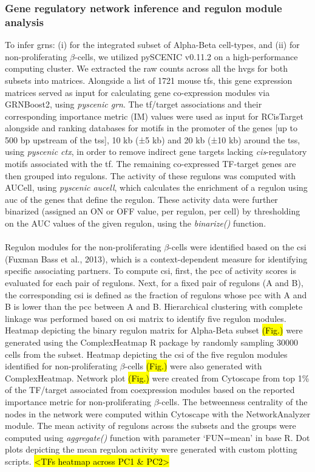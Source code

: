 \subsubsection{\large Gene regulatory network inference and regulon module analysis}
To infer \glspl{grn}: (i) for the integrated subset of Alpha-Beta cell-types, and (ii) for non-proliferating $\beta$-cells, we utilized pySCENIC v0.11.2 on a high-performance computing cluster. We extracted the raw counts across all the \glspl{hvg} for both subsets into matrices. Alongside a list of 1721 mouse \glspl{tf}, this gene expression matrices served as input for calculating gene co-expression modules via GRNBoost2, using \textit{pyscenic grn}. The \gls{tf}/target associations and their corresponding importance metric (IM) values were used as input for RCisTarget alongside and ranking databases for motifs in the promoter of the genes [up to 500 \gls{bp} upstream of the \gls{tss}], 10 kb (±5 kb) and 20 kb (±10 kb) around the \gls{tss}, using \textit{pyscenic ctx}, in order to remove indirect gene targets lacking \textit{cis}-regulatory motifs associated with the \gls{tf}. The remaining co-expressed TF-target genes are then grouped into regulons. The activity of these regulons was computed with AUCell, using \textit{pyscenic aucell}, which calculates the enrichment of a regulon using \gls{auc} of the genes that define the regulon. These activity data were further binarized (assigned an ON or OFF value, per regulon, per cell) by thresholding on the AUC values of the given regulon, using the \textit{binarize()} function.\\\\
Regulon modules for the non-proliferating $\beta$-cells were identified based on the \gls{csi} (Fuxman Bass et al., 2013), which is a context-dependent measure for identifying specific associating partners. To compute \gls{csi}, first, the \gls{pcc} of activity scores is evaluated for each pair of regulons. Next, for a fixed pair of regulons (A and B), the corresponding \gls{csi} is defined as the fraction of regulons whose \gls{pcc} with A and B is lower than the \gls{pcc} between A and B. Hierarchical clustering with complete linkage was performed based on \gls{csi} matrix to identify five regulon modules.\\


Heatmap depicting the binary regulon matrix for Alpha-Beta subset \hl{(Fig.)} were generated using the ComplexHeatmap R package by randomly sampling 30000 cells from the subset. Heatmap depicting the \gls{csi} of the five regulon modules identified for non-proliferating $\beta$-cells \hl{(Fig.)} were also generated with ComplexHeatmap.  Network plot \hl{(Fig.)} were created from Cytoscape from top 1\%  of the TF/target associated from coexpression modules based on the reported importance metric for non-proliferating $\beta$-cells. The betweenness centrality of the nodes in the network were computed within Cytoscape with the NetworkAnalyzer module. The mean activity of regulons across the subsets and the groups were computed using \textit{aggregate()} function with parameter `FUN=mean' in base R. Dot plots depicting the mean regulon activity were generated with custom plotting scripts.  \hl{<TFs heatmap across PC1 \& PC2>}


